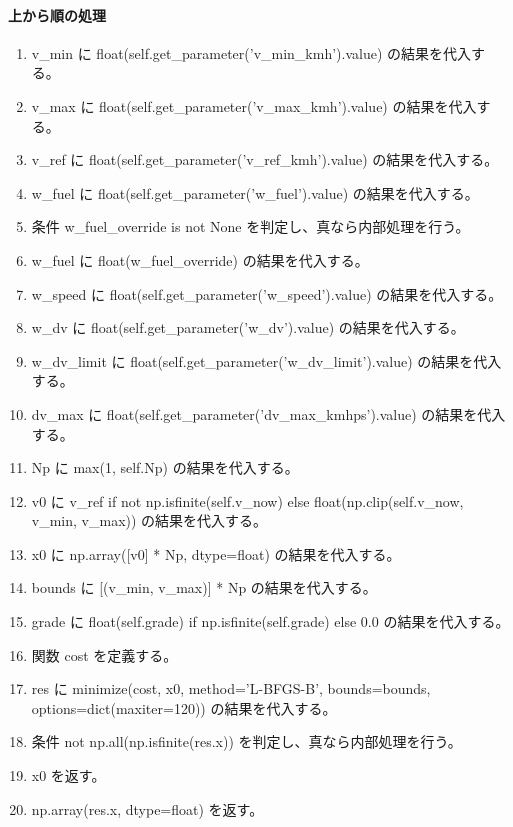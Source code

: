 \documentclass[a4paper,11pt]{article}
\begin{document}
            \paragraph{上から順の処理}
            \begin{enumerate}[leftmargin=1.8em]
            \item v\_min に float(self.get\_parameter('v\_min\_kmh').value) の結果を代入する。
\item v\_max に float(self.get\_parameter('v\_max\_kmh').value) の結果を代入する。
\item v\_ref に float(self.get\_parameter('v\_ref\_kmh').value) の結果を代入する。
\item w\_fuel に float(self.get\_parameter('w\_fuel').value) の結果を代入する。
\item 条件 w\_fuel\_override is not None を判定し、真なら内部処理を行う。
\item   w\_fuel に float(w\_fuel\_override) の結果を代入する。
\item w\_speed に float(self.get\_parameter('w\_speed').value) の結果を代入する。
\item w\_dv に float(self.get\_parameter('w\_dv').value) の結果を代入する。
\item w\_dv\_limit に float(self.get\_parameter('w\_dv\_limit').value) の結果を代入する。
\item dv\_max に float(self.get\_parameter('dv\_max\_kmhps').value) の結果を代入する。
\item Np に max(1, self.Np) の結果を代入する。
\item v0 に v\_ref if not np.isfinite(self.v\_now) else float(np.clip(self.v\_now, v\_min, v\_max)) の結果を代入する。
\item x0 に np.array([v0] * Np, dtype=float) の結果を代入する。
\item bounds に [(v\_min, v\_max)] * Np の結果を代入する。
\item grade に float(self.grade) if np.isfinite(self.grade) else 0.0 の結果を代入する。
\item 関数 cost を定義する。
\item res に minimize(cost, x0, method='L-BFGS-B', bounds=bounds, options=dict(maxiter=120)) の結果を代入する。
\item 条件 not np.all(np.isfinite(res.x)) を判定し、真なら内部処理を行う。
\item   x0 を返す。
\item np.array(res.x, dtype=float) を返す。
            \end{enumerate}
\end{document}
